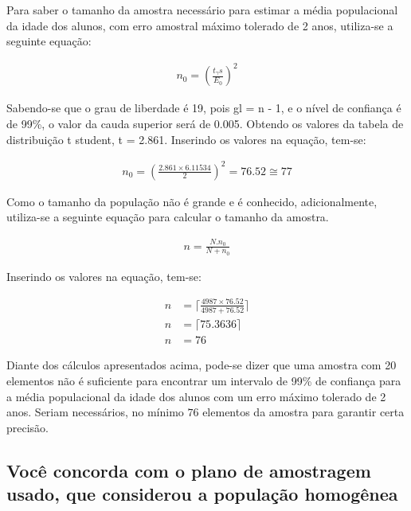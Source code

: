 	Para saber o tamanho da amostra necessário para estimar a média
	populacional da idade dos alunos, com erro amostral máximo tolerado de 2
	anos, utiliza-se a seguinte equação:

	\begin{align}
		\label{eq:dois-b-expr1}
		 n_0 = \left (\frac{t_\gamma s}{E_0} \right)^2
	\end{align}

	Sabendo-se que o grau de liberdade é 19, pois gl = n - 1, e o nível de
	confiança é de 99\%, o valor da cauda superior será de \num{0,005}. Obtendo os
	valores da tabela de distribuição t student, t = \num{2,861}.
	Inserindo os valores na equação, tem-se:

	\begin{align*}
		n_0 = \left (\frac{\num{2,861} \times \num{6,11534}}{2} \right)^2 = \num{76,52} \cong 77
	\end{align*}

	Como o tamanho da população não é grande e é conhecido, adicionalmente,
	utiliza-se a seguinte equação para calcular o tamanho da amostra.

	\begin{align}
		\label{eq:dois-b-expr2}
		n = \frac{N . n_0}{N + n_0}
	\end{align}

	Inserindo os valores na equação, tem-se:

	\begin{align*}
		n &= \Big\lceil \frac{4987 \times \num{76,52}}{4987 + \num{76,52}} \Big\rceil \\
		n &= \lceil \num{75,3636} \rceil \\
		n &= 76
	\end{align*}

	Diante dos cálculos apresentados acima, pode-se dizer que uma amostra
	com 20 elementos não é suficiente para encontrar um intervalo de 99\% de
	confiança para a média populacional da idade dos alunos com um erro
	máximo tolerado de 2 anos. Seriam necessários, no mínimo $76$ elementos da
	amostra para garantir certa precisão. 

\subsection{Você concorda com o plano de amostragem usado, que considerou a população homogênea}
	
